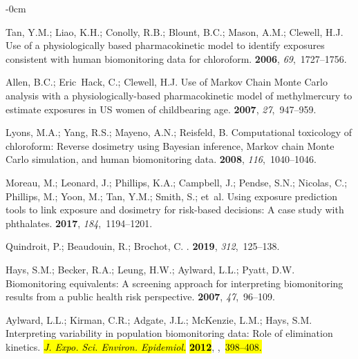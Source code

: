 \documentclass[toxics,article,accept,pdftex,moreauthors]{Definitions/mdpi}
\begin{document}
\begin{adjustwidth}{-\extralength}{0cm}
\begin{thebibliography}{999}
Tan, Y.M.; Liao, K.H.; Conolly, R.B.; Blount, B.C.; Mason, A.M.; Clewell, H.J.
\newblock Use of a physiologically based pharmacokinetic model to identify
  exposures consistent with human biomonitoring data for chloroform.
 {\bf
  2006}, {\em 69},~1727--1756.

Allen, B.C.; Eric~Hack, C.; Clewell, H.J.
\newblock Use of Markov Chain Monte Carlo analysis with a physiologically-based
  pharmacokinetic model of methylmercury to estimate exposures in US women of
  childbearing age.
 {\bf 2007}, {\em
  27},~947--959.

Lyons, M.A.; Yang, R.S.; Mayeno, A.N.; Reisfeld, B.
\newblock Computational toxicology of chloroform: Reverse dosimetry using
  Bayesian inference, Markov chain Monte Carlo simulation, and human
  biomonitoring data.
 {\bf 2008}, {\em
  116},~1040--1046.

Moreau, M.; Leonard, J.; Phillips, K.A.; Campbell, J.; Pendse, S.N.; Nicolas,
  C.; Phillips, M.; Yoon, M.; Tan, Y.M.; Smith, S.;  et~al.
\newblock Using exposure prediction tools to link exposure and dosimetry for
  risk-based decisions: A case study with phthalates.
 {\bf 2017}, {\em 184},~1194--1201.

Quindroit, P.; Beaudouin, R.; Brochot, C.
.
 {\bf 2019}, {\em 312},~125--138.

Hays, S.M.; Becker, R.A.; Leung, H.W.; Aylward, L.L.; Pyatt, D.W.
\newblock Biomonitoring equivalents: A screening approach for interpreting
  biomonitoring results from a public health risk perspective.
 {\bf 2007}, {\em
  47},~96--109.

Aylward, L.L.; Kirman, C.R.; Adgate, J.L.; {McKenzie}, L.M.; Hays, S.M.
\newblock Interpreting variability in population biomonitoring data: Role of
  elimination kinetics. \emph{\hl{J. Expo. Sci. Environ. Epidemiol.} %
} \textbf{\hl{2012}},
,~\hl{398--408.} %



\end{thebibliography}
\end{adjustwidth}
\end{document}
